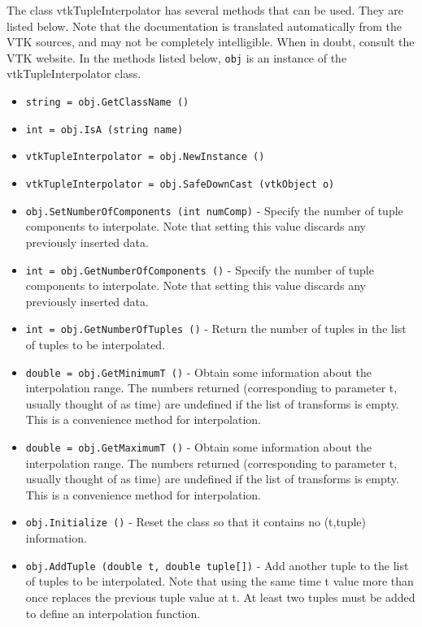 The class vtkTupleInterpolator has several methods that can be used.
  They are listed below.
Note that the documentation is translated automatically from the VTK sources,
and may not be completely intelligible.  When in doubt, consult the VTK website.
In the methods listed below, \verb|obj| is an instance of the vtkTupleInterpolator class.
\begin{itemize}
\item  \verb|string = obj.GetClassName ()|

\item  \verb|int = obj.IsA (string name)|

\item  \verb|vtkTupleInterpolator = obj.NewInstance ()|

\item  \verb|vtkTupleInterpolator = obj.SafeDownCast (vtkObject o)|

\item  \verb|obj.SetNumberOfComponents (int numComp)| -  Specify the number of tuple components to interpolate. Note that setting
 this value discards any previously inserted data.

\item  \verb|int = obj.GetNumberOfComponents ()| -  Specify the number of tuple components to interpolate. Note that setting
 this value discards any previously inserted data.

\item  \verb|int = obj.GetNumberOfTuples ()| -  Return the number of tuples in the list of tuples to be
 interpolated.

\item  \verb|double = obj.GetMinimumT ()| -  Obtain some information about the interpolation range. The numbers
 returned (corresponding to parameter t, usually thought of as time)
 are undefined if the list of transforms is empty. This is a convenience
 method for interpolation.

\item  \verb|double = obj.GetMaximumT ()| -  Obtain some information about the interpolation range. The numbers
 returned (corresponding to parameter t, usually thought of as time)
 are undefined if the list of transforms is empty. This is a convenience
 method for interpolation.

\item  \verb|obj.Initialize ()| -  Reset the class so that it contains no (t,tuple) information.

\item  \verb|obj.AddTuple (double t, double tuple[])| -  Add another tuple to the list of tuples to be interpolated.  Note that
 using the same time t value more than once replaces the previous tuple
 value at t.  At least two tuples must be added to define an
 interpolation function.


\end{itemize}

